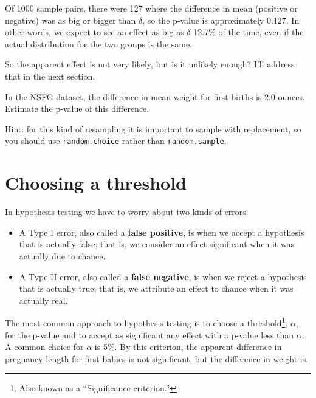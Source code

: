 \documentclass[12pt]{book}
\begin{document}
Of 1000 sample pairs, there were 127 where the difference in mean
(positive or negative) was as big or bigger than $\delta$, so the
p-value is approximately 0.127.  In other words, we expect to see an
effect as big as $\delta$ 12.7\% of the time, even if the actual
distribution for the two groups is the same.

So the apparent effect is not very likely, but is it unlikely enough?
I'll address that in the next section.

\begin{ex}

In the NSFG dataset, the difference in mean weight for first
births is 2.0 ounces.  Estimate the p-value of this difference.

Hint: for this kind of resampling it is important to sample
with replacement, so you should use {\tt random.choice} rather
than {\tt random.sample}.



\end{ex}


\section{Choosing a threshold}
\label{threshold}

In hypothesis testing we have to worry about two kinds of errors.

\begin{itemize}

\item A Type I error, also called a {\bf false positive}, is when we
  accept a hypothesis that is actually false; that is, we consider an
  effect significant when it was actually due to chance.

\item A Type II error, also called a {\bf false negative}, is when we
  reject a hypothesis that is actually true; that is, we attribute an
  effect to chance when it was actually real.

\end{itemize}

The most common approach to hypothesis testing is to choose a
threshold\footnote{Also known as a ``Significance criterion.''},
$\alpha$, for the p-value and to accept as significant any effect with
a p-value less than $\alpha$.  A common choice for $\alpha$ is 5\%.
By this criterion, the apparent difference in pregnancy length for
first babies is not significant, but the difference in weight is.
\end{document}
